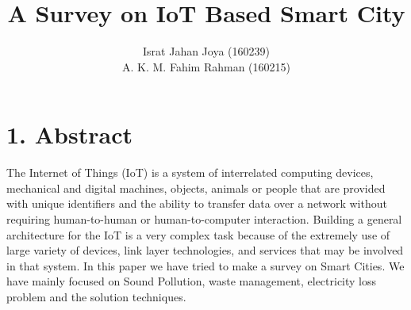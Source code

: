 \documentclass[a4paper]{report}
\title{ A Survey on IoT Based Smart City}
\author{Israt Jahan Joya (160239) \\ A. K. M. Fahim Rahman (160215)}
\begin{document}
	
	\maketitle
	
	
	
	\section*{1. Abstract}
	The Internet of Things (IoT) is a system of interrelated computing devices, mechanical and digital machines, objects, animals or people that are provided with unique identifiers and the ability to transfer data over a network without requiring human-to-human or human-to-computer interaction. Building a general architecture for the IoT is a very complex task because of the extremely use of large variety of devices, link layer technologies, and services that may be involved in that system. In this paper we have tried to make a survey on Smart Cities. We have mainly focused on Sound Pollution, waste management, electricity loss problem and the solution techniques.  
\end{document}
